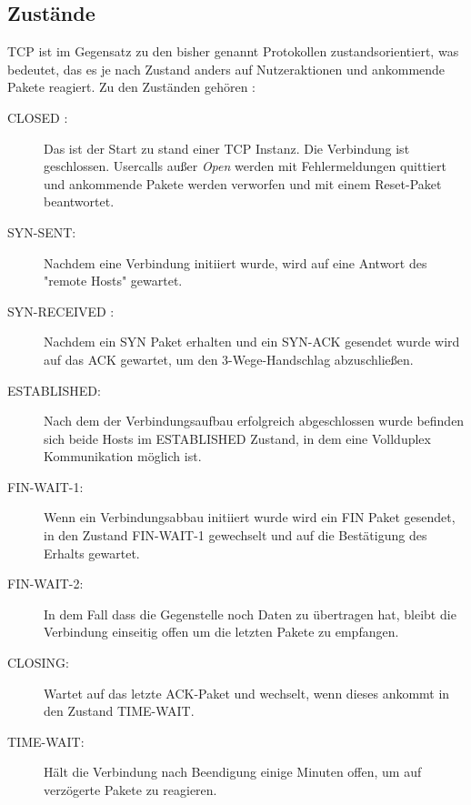 \FloatBarrier
\subsection{Zustände}
TCP ist im Gegensatz zu den bisher genannt Protokollen zustandsorientiert, was bedeutet, das es je nach Zustand anders auf Nutzeraktionen und ankommende Pakete reagiert. 
Zu den Zuständen gehören :



\begin{description}

\item[CLOSED : ]Das ist der Start zu stand einer TCP Instanz. Die Verbindung ist geschlossen. Usercalls außer \textit{Open} werden mit Fehlermeldungen quittiert und ankommende Pakete werden verworfen und mit einem Reset-Paket beantwortet.
\item[SYN-SENT: ]Nachdem eine Verbindung initiiert wurde, wird auf eine Antwort des {}"remote Hosts"{} gewartet. 
\item[SYN-RECEIVED : ] Nachdem ein SYN Paket erhalten und ein SYN-ACK gesendet wurde wird auf das ACK gewartet, um den 3-Wege-Handschlag abzuschließen. 
\item[ESTABLISHED: ] Nach dem der Verbindungsaufbau erfolgreich abgeschlossen wurde befinden sich beide Hosts im ESTABLISHED Zustand, in dem eine Vollduplex Kommunikation möglich ist. 
\item[FIN-WAIT-1: ] Wenn ein Verbindungsabbau initiiert wurde wird ein FIN Paket gesendet, in den Zustand FIN-WAIT-1 gewechselt und auf die Bestätigung des Erhalts gewartet. 
\item[FIN-WAIT-2: ] In dem Fall dass die Gegenstelle noch Daten zu übertragen hat, bleibt die Verbindung einseitig offen um die letzten Pakete zu empfangen. 
\item[CLOSING: ]	Wartet auf das letzte ACK-Paket und wechselt, wenn dieses ankommt in den Zustand TIME-WAIT.
\item[TIME-WAIT: ] Hält die Verbindung nach Beendigung einige Minuten offen, um auf verzögerte Pakete zu reagieren.
\end{description}

